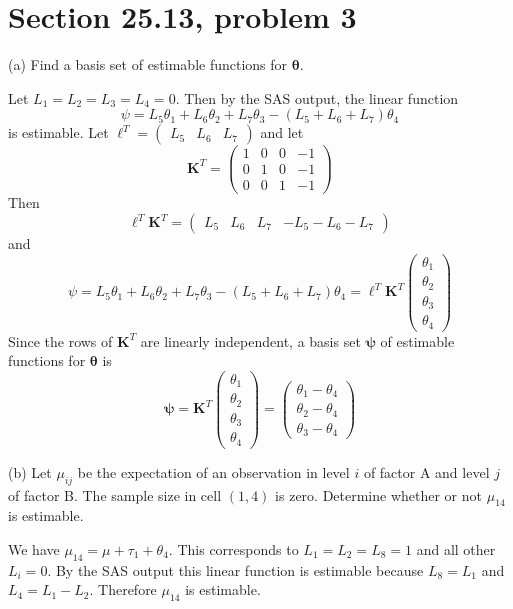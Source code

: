 
\section{Section 25.13, problem 3}
(a) Find a basis set of estimable functions for $\bm\theta$.

\bigskip
\noindent
Let $L_1=L_2=L_3=L_4=0$.
Then by the SAS output, the linear function
\[
\psi=L_5\theta_1+L_6\theta_2+L_7\theta_3-(L_5+L_6+L_7)\theta_4
\] is estimable.
Let $\bm\ell^T=\begin{pmatrix}
L_5 & L_6 & L_7\end{pmatrix}$ and let
\[
\mathbf K^T=
\begin{pmatrix}
1 & 0 & 0 & -1\\
0 & 1 & 0 & -1\\
0 & 0 & 1 & -1
\end{pmatrix}
\]
Then
\[
\bm\ell^T\mathbf K^T=
\begin{pmatrix}
L_5 & L_6 & L_7 & -L_5-L_6-L_7
\end{pmatrix}
\]
and
\[
\psi=L_5\theta_1+L_6\theta_2+L_7\theta_3-(L_5+L_6+L_7)\theta_4=
\bm\ell^T\mathbf K^T
\begin{pmatrix}
\theta_1\\
\theta_2\\
\theta_3\\
\theta_4
\end{pmatrix}
\]
Since the rows of $\mathbf K^T$ are linearly independent,
a basis set $\bm\psi$ of estimable functions for $\bm\theta$ is
\[
\bm\psi=
\mathbf K^T
\begin{pmatrix}
\theta_1\\
\theta_2\\
\theta_3\\
\theta_4
\end{pmatrix}
=\begin{pmatrix}
\theta_1-\theta_4\\
\theta_2-\theta_4\\
\theta_3-\theta_4
\end{pmatrix}
\]

\bigskip
\noindent
(b) Let $\mu_{ij}$ be the expectation of an observation in level
$i$ of factor A and level $j$ of factor B.
The sample size in cell $(1,4)$ is zero.
Determine whether or not $\mu_{14}$ is estimable.

\bigskip
\noindent
We have $\mu_{14}=\mu+\tau_1+\theta_4$.
This corresponds to $L_1=L_2=L_8=1$ and all other $L_i=0$.
By the SAS output this linear function is estimable because
$L_8=L_1$ and $L_4=L_1-L_2$. Therefore $\mu_{14}$ is estimable.
